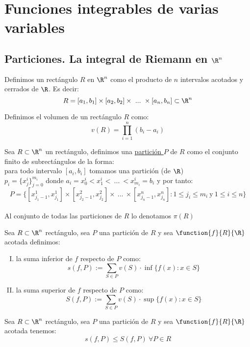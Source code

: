 	\chapter{Funciones integrables de varias variables}
	\section{Particiones. La integral de Riemann en $\R^n$}	
	
	\begin{defi} Definimos un rectángulo $R$ en $\R^n$ como el producto de $n$ intervalos acotados y cerrados de $\R$. Es decir:\\
	\[R=[a_1,b_1]\times [a_2,b_2]\times\ ...\ \times[a_n,b_n]\subset \R^n\] 
	\end{defi}
	
	\begin{defi} Definimos el volumen de un rectángulo $R$ como:\\
	\[v(R)=\prod_{i=1}^n(b_i-a_i)\] 
	\end{defi}	
	
	\begin{defi} Sea $R\subset \R^n$ un rectángulo, definimos una \underline{partición $P$} de $R$ como el conjunto finito de subrectángulos de la forma:\\
	para todo intervalo $[a_i,b_i]$ tomamos una partición (de $\R$) \\
	$p_i=\{x_j^i\}_{j=0}^{m_i}$ donde $a_i=x^i_0<x^i_1<\ ...\ <x^i_{m_i}=b_i$ y por tanto:
	\[P=\{[x^1_{j_1-1},x^1_{j_1}]\times[x^2_{j_2-1},x^2_{j_2}]\times\ ...\ \times[x^n_{j_n-1},x^n_{j_n}]:1\leq j_i\leq m_i\ \mathrm{y}\ 1\leq i\leq n\}\]\\
	Al conjunto de todas las particiones de $R$ lo denotamos $\pi(R)$
	\end{defi}
	
	\begin{defi} Sea $R\subset \R^n$ rectángulo, sea $P$ una partición de $R$ y sea  $\function{f}{R}{\R}$ acotada definimos:
	\begin{enumerate}[I)]
	\item la suma inferior de $f$ respecto de $P$ como:
	\[s(f,P):=\sum_{S\in P} v(S)\cdot\inf\{f(x):x\in S\}  \]
	\item la suma superior de $f$ respecto de $P$ como:
	\[S(f,P):=\sum_{S\in P} v(S)\cdot\sup\{f(x):x\in S\}  \]
	\end{enumerate}
	\end{defi}
	
	\begin{proposicion} Sea $R\subset \R^n$ rectángulo, sea $P$ una partición de $R$ y sea  $\function{f}{R}{\R}$ acotada tenemos:
	\[s(f,P)\leq S(f,P)\ \forall P\in R\]
	\end{proposicion}
	
